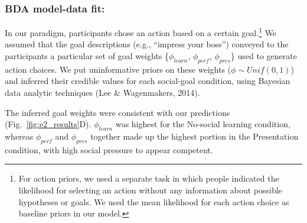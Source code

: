 \documentclass[10pt, letterpaper]{article}
\begin{document}
\hypertarget{bda-model-data-fit}{%
\subsubsection{BDA model-data fit:}\label{bda-model-data-fit}}

In our paradigm, participants chose an action based on a certain
goal.\footnote{For action priors, we used a separate task in which people indicated the likelihood for selecting an action without any information about possible hypotheses or goals. We used the mean likelihood for each action choice as baseline priors in our model.}
We assumed that the goal descriptions (e.g., ``impress your boss'')
conveyed to the participants a particular set of goal weights
\{\(\phi_{learn}\), \(\phi_{perf}\), \(\phi_{pres}\)\} used to generate
action choices. We put uninformative priors on these weights
(\(\phi \sim Unif(0,1)\)) and inferred their credible values for each
social-goal condition, using Bayesian data analytic techniques (Lee \&
Wagenmakers, 2014).

The inferred goal weights were consistent with our predictions
(Fig.~\ref{fig:e2_results}D). \(\phi_{learn}\) was highest for the
No-social learning condition, whereas \(\phi_{perf}\) and
\(\phi_{pres}\) together made up the highest portion in the Presentation
condition, with high social pressure to appear competent.
\end{document}
